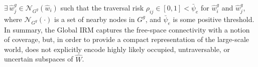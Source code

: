 \documentclass[letterpaper]{article} %
\newcommand{\ph}[1]{{\textbf{#1}:}} %
\begin{document}
\begin{enumerate}[label={\arabic*)}]
 $\exists \, \hat{w}^g_j \in \mathcal{N}_{G^g}(\hat{w}_i)$ such that the traversal risk $\rho_{ij} \in [0, 1] < \bar{\psi}_e$ for $\hat{w}^g_i$ and $\hat{w}^g_j$, where $\mathcal{N}_{G^g}(\cdot)$ is a set of nearby nodes in $G^g$, and $\bar{\psi}_e$ is some positive threshold.
%
In summary, the Global IRM captures the free-space connectivity with a notion of coverage, but, in order to provide a compact representation of the large-scale world, does not explicitly encode highly likely occupied, untraversable, or uncertain subspaces of $\hat{W}$.
%
\end{enumerate}

%
\end{document}
